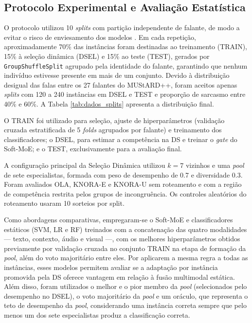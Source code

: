 \documentclass[conference]{IEEEtran}
\begin{document}

\subsection{Protocolo Experimental e Avaliação Estatística}

O protocolo utilizou 10 \textit{splits} com partição independente de falante, de modo a evitar o risco de enviesamento dos modelos \cite{ray2022multimodal, wang2026bottleneck}. Em cada repetição, aproximadamente 70\% das instâncias foram destinadas ao treinamento (TRAIN), 15\% à seleção dinâmica (DSEL) e 15\% ao teste (TEST), gerados por \texttt{GroupShuffleSplit} agrupado pela identidade do falante, garantindo que nenhum indivíduo estivesse presente em mais de um conjunto. Devido à distribuição desigual das falas entre os 27 falantes do MUStARD++, foram aceitos apenas \textit{splits} com 120 a 240 instâncias em DSEL e TEST e proporção de sarcasmo entre 40\% e 60\%. A Tabela \ref{tab:dados_splits} apresenta a distribuição final.



O TRAIN foi utilizado para seleção, ajuste de hiperparâmetros (validação cruzada estratificada de 5 \textit{folds} agrupados por falante) e treinamento dos classificadores; o DSEL, para estimar a competência na DS e treinar o \textit{gate} do Soft-MoE; e o TEST, exclusivamente para a avaliação final. 

A configuração principal da Seleção Dinâmica utilizou $k=7$ vizinhos e uma \textit{pool} de sete especialistas, formada com peso de desempenho de 0.7 e diversidade 0.3. Foram avaliados OLA, KNORA-E e KNORA-U sem roteamento e com a região de competência restrita pelos grupos de incongruência. Os controles aleatórios do roteamento usaram 10 sorteios por split.

Como abordagens comparativas, empregaram-se o Soft-MoE e classificadores estáticos (SVM, LR e RF) treinados com a concatenação das quatro modalidades — texto, contexto, áudio e visual —, com os melhores hiperparâmetros obtidos previamente por validação cruzada no conjunto TRAIN na etapa de formação da \textit{pool}, além do voto majoritário entre eles. Por aplicarem a mesma regra a todas as instâncias, esses modelos permitem avaliar se a adaptação por instância promovida pela DS oferece vantagem em relação à fusão multimodal estática. Além disso, foram utilizados o melhor e o pior membro da \textit{pool} (selecionados pelo desempenho no DSEL), o voto majoritário da \textit{pool} e um oráculo, que representa o teto de desempenho da \textit{pool}, considerando uma instância correta sempre que pelo menos um dos sete especialistas produz a classificação correta.
\end{document}
